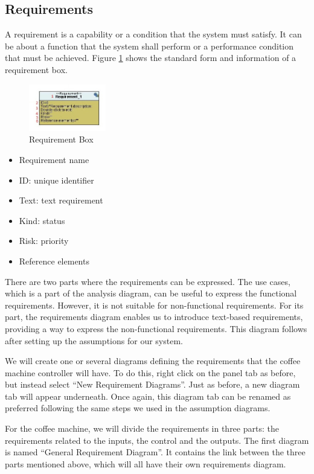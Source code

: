 \documentclass[12pt]{article}
\begin{document}
\subsection{Requirements}
A requirement is a capability or a condition that the system must satisfy. It can be about a function that the system shall perform or a performance condition that must be achieved. Figure \ref{fig:reqbox} shows the standard form and information of a requirement box.

\begin{figure}[htbp]
\centering
\includegraphics[width=0.3\textwidth]{fig/reqbox.jpg}
\caption{Requirement Box} \label{fig:reqbox}
\end{figure}

\begin{itemize}
\item Requirement name
\item ID: unique identifier
\item Text: text requirement
\item Kind: status
\item Risk: priority
\item Reference elements
\end{itemize}

There are two parts where the requirements can be expressed. The use cases, which is a part of the analysis diagram, can be useful to express the functional requirements. However, it is not suitable for non-functional requirements. For its part, the requirements diagram enables us to introduce text-based requirements, providing a way to express the non-functional requirements. This diagram follows after setting up the assumptions for our system.

We will create one or several diagrams defining the requirements that the coffee machine controller will have. To do this, right click on the panel tab as before, but instead select “New Requirement Diagrams”. Just as before, a new diagram tab will appear underneath. Once again, this diagram tab can be renamed as preferred following the same steps we used in the assumption diagrams.
	
For the coffee machine, we will divide the requirements in three parts: the requirements related to the inputs, the control and the outputs.
The first diagram is named ``General Requirement Diagram''. It contains the link between the three parts mentioned above, which will all have their own requirements diagram. 
	
\end{document}

